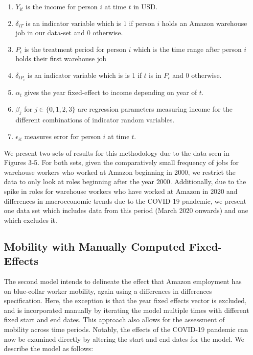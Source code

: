 \documentclass[11pt]{article}
\begin{document}
\begin{enumerate}
    \item $Y_{it}$ is the income for person $i$ at time $t$ in USD.
    \item $\delta_{iT}$ is an indicator variable which is $1$ if person $i$ holds an Amazon warehouse job in our data-set and $0$ otherwise.
    \item $P_i$ is the treatment period for person $i$ which is the time range after person $i$ holds their first warehouse job
    \item $\delta_{tP_i}$ is an indicator variable which is is $1$ if $t$ is in $P_i$ and $0$ otherwise.
    \item $\alpha_t$ gives the year fixed-effect to income depending on year of $t$.
    \item $\beta_j$ for $j\in \{0,1,2,3\}$ are regression parameters measuring income for the different combinations of indicator random variables.
    \item $\epsilon_{it}$ measures error for person $i$ at time $t$.
\end{enumerate}

We present two sets of results for this methodology due to the data seen in Figures 3-5. For both sets, given the comparatively small frequency of jobs for warehouse workers who worked at Amazon beginning in 2000, we restrict the data to only look at roles beginning after the year $2000$. Additionally, due to the spike in roles for warehouse workers who have worked at Amazon in 2020 and differences in macroeconomic trends due to the COVID-19 pandemic, we present one data set which includes data from this period (March 2020 onwards) and one which excludes it. 



\subsection{Mobility with Manually Computed Fixed-Effects}

\-\hspace{0.5cm} The second model intends to delineate the effect that Amazon employment has on blue-collar worker mobility, again using a differences in differences specification. Here, the exception is that the year fixed effects vector is excluded, and is incorporated manually by iterating the model multiple times with different fixed start and end dates. This approach also allows for the assessment of mobility across time periods. Notably, the effects of the COVID-19 pandemic can now be examined directly by altering the start and end dates for the model. We describe the model as follows:
\end{document}
